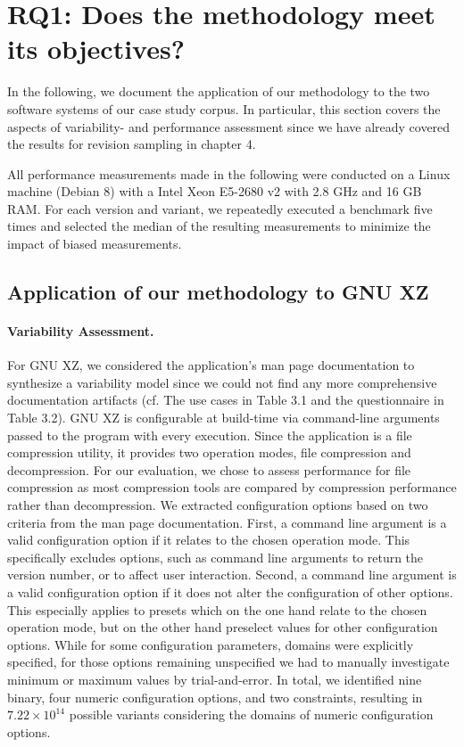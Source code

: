 \section{RQ1: Does the methodology meet its objectives?}\label{sec:expsetup}
In the following, we document the application of our methodology to the two
software systems of our case study corpus. In particular, this section covers
the aspects of variability- and performance assessment since we have already
covered the results for revision sampling in chapter 4. 

All performance measurements made in the
following were conducted on a Linux machine (Debian 8) with a Intel Xeon
E5-2680 v2 with 2.8 GHz and 16 GB RAM. For each version and variant, we
repeatedly executed  a benchmark five times and selected the median of the
resulting measurements to minimize the impact of biased measurements.

\subsection{Application of our methodology to GNU XZ}
\paragraph{Variability Assessment.} For GNU XZ, we considered the application’s
man page documentation to synthesize a variability model since we could not
find any more comprehensive documentation artifacts (cf. The use cases in Table
3.1 and the questionnaire in Table 3.2).   GNU XZ is configurable at build-time
via command-line arguments passed to the program with every execution. Since
the application is a file compression utility, it provides two operation modes,
file compression and decompression. For our evaluation, we chose to assess
performance for file compression as most compression tools are compared by
compression performance rather than decompression. We extracted configuration
options based on two criteria from the man page documentation. First, a command
line argument is a valid configuration option if it relates to the chosen
operation mode. This specifically excludes options, such as command line
arguments to return the version number, or to affect user interaction. Second,
a command line argument is a valid configuration option if it does not alter
the configuration of other options. This especially applies to presets which on
the one hand relate to the chosen operation mode, but on the other hand
preselect values for other configuration options. While for some configuration
parameters, domains were explicitly specified, for those options remaining
unspecified we had to manually investigate minimum or maximum values by
trial-and-error. In total, we identified nine binary, four numeric
configuration options, and two constraints, resulting in $7.22 \times 10^{14}$
possible variants considering the domains of numeric configuration options.

